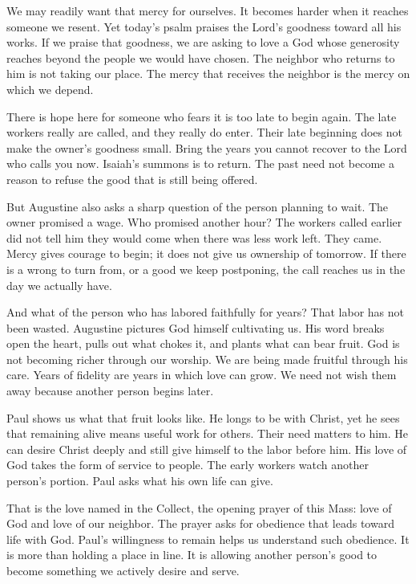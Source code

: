 We may readily want that mercy for ourselves. It becomes harder when it reaches someone we resent. Yet today's psalm praises the Lord's goodness toward all his works. If we praise that goodness, we are asking to love a God whose generosity reaches beyond the people we would have chosen. The neighbor who returns to him is not taking our place. The mercy that receives the neighbor is the mercy on which we depend.

There is hope here for someone who fears it is too late to begin again. The late workers really are called, and they really do enter. Their late beginning does not make the owner's goodness small. Bring the years you cannot recover to the Lord who calls you now. Isaiah's summons is to return. The past need not become a reason to refuse the good that is still being offered.

But Augustine also asks a sharp question of the person planning to wait. The owner promised a wage. Who promised another hour? The workers called earlier did not tell him they would come when there was less work left. They came. Mercy gives courage to begin; it does not give us ownership of tomorrow. If there is a wrong to turn from, or a good we keep postponing, the call reaches us in the day we actually have.

And what of the person who has labored faithfully for years? That labor has not been wasted. Augustine pictures God himself cultivating us. His word breaks open the heart, pulls out what chokes it, and plants what can bear fruit. God is not becoming richer through our worship. We are being made fruitful through his care. Years of fidelity are years in which love can grow. We need not wish them away because another person begins later.

Paul shows us what that fruit looks like. He longs to be with Christ, yet he sees that remaining alive means useful work for others. Their need matters to him. He can desire Christ deeply and still give himself to the labor before him. His love of God takes the form of service to people. The early workers watch another person's portion. Paul asks what his own life can give.

That is the love named in the Collect, the opening prayer of this Mass: love of God and love of our neighbor. The prayer asks for obedience that leads toward life with God. Paul's willingness to remain helps us understand such obedience. It is more than holding a place in line. It is allowing another person's good to become something we actively desire and serve.

